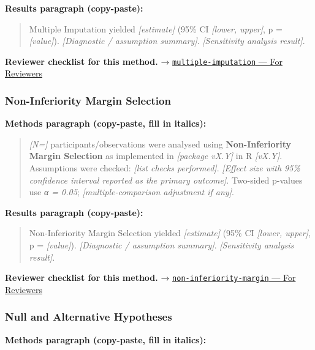 \documentclass[
]{article}
\begin{document}
\textbf{Results paragraph (copy-paste):}

\begin{quote}
Multiple Imputation yielded \emph{{[}estimate{]}} (95\% CI
\emph{{[}lower, upper{]}}, p = \emph{{[}value{]}}). \emph{{[}Diagnostic
/ assumption summary{]}}. \emph{{[}Sensitivity analysis result{]}}.
\end{quote}

\textbf{Reviewer checklist for this method.} →
\href{../chapters/14-clinical/multiple-imputation.Rmd\#for-reviewers}{\texttt{multiple-imputation}
--- For Reviewers}

\subsubsection{Non-Inferiority Margin
Selection}\label{non-inferiority-margin-selection}

\textbf{Methods paragraph (copy-paste, fill in italics):}

\begin{quote}
\emph{{[}N={]}} participants/observations were analysed using
\textbf{Non-Inferiority Margin Selection} as implemented in
\emph{{[}package vX.Y{]}} in R \emph{{[}vX.Y{]}}. Assumptions were
checked: \emph{{[}list checks performed{]}}. \emph{{[}Effect size with
95\% confidence interval reported as the primary outcome{]}}. Two-sided
p-values use \emph{α = 0.05}; \emph{{[}multiple-comparison adjustment if
any{]}}.
\end{quote}

\textbf{Results paragraph (copy-paste):}

\begin{quote}
Non-Inferiority Margin Selection yielded \emph{{[}estimate{]}} (95\% CI
\emph{{[}lower, upper{]}}, p = \emph{{[}value{]}}). \emph{{[}Diagnostic
/ assumption summary{]}}. \emph{{[}Sensitivity analysis result{]}}.
\end{quote}

\textbf{Reviewer checklist for this method.} →
\href{../chapters/14-clinical/non-inferiority-margin.Rmd\#for-reviewers}{\texttt{non-inferiority-margin}
--- For Reviewers}

\subsubsection{Null and Alternative
Hypotheses}\label{null-and-alternative-hypotheses}

\textbf{Methods paragraph (copy-paste, fill in italics):}
\end{document}
